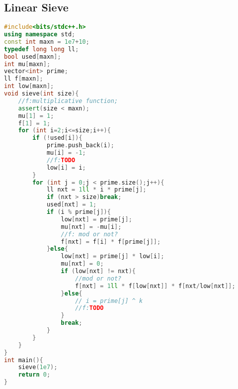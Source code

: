 \subsection{Linear Sieve}
\begin{lstlisting}[language=C++]
#include<bits/stdc++.h>
using namespace std;
const int maxn = 1e7+10;
typedef long long ll;
bool used[maxn];
int mu[maxn];
vector<int> prime;
ll f[maxn];
int low[maxn];
void sieve(int size){
    //f:multiplicative function;
    assert(size < maxn);
    mu[1] = 1;
    f[1] = 1;
    for (int i=2;i<=size;i++){
        if (!used[i]){
            prime.push_back(i);
            mu[i] = -1;
            //f:TODO
            low[i] = i;
        }
        for (int j = 0;j < prime.size();j++){
            ll nxt = 1ll * i * prime[j];
            if (nxt > size)break;
            used[nxt] = 1;
            if (i % prime[j]){
                low[nxt] = prime[j];
                mu[nxt] = -mu[i];
                //f: mod or not?
                f[nxt] = f[i] * f[prime[j]];
            }else{
                low[nxt] = prime[j] * low[i];
                mu[nxt] = 0;
                if (low[nxt] != nxt){
                    //mod or not?
                    f[nxt] = 1ll * f[low[nxt]] * f[nxt/low[nxt]];
                }else{
                    // i = prime[j] ^ k
                    //f:TODO
                }
                break;
            }
        }
    }
}
int main(){
    sieve(1e7);
    return 0;
}
\end{lstlisting}
